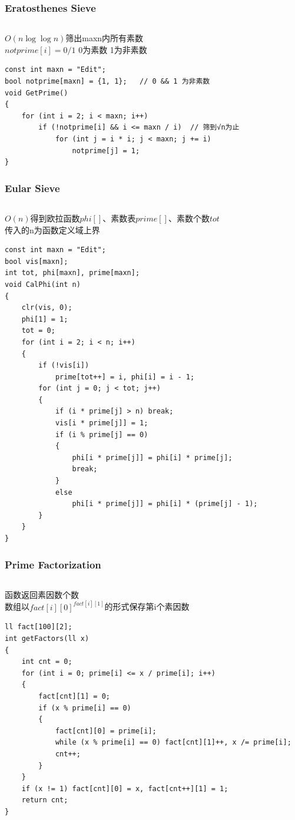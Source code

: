\documentclass[twoside]{article}
\begin{document}
\subsubsection{Eratosthenes Sieve}
\begin{lstlisting}
\end{lstlisting}
$O(n\log\log n)$筛出maxn内所有素数\\
$notprime[i] = 0/1$ 0为素数 1为非素数\\
\begin{lstlisting}
const int maxn = "Edit";
bool notprime[maxn] = {1, 1};   // 0 && 1 为非素数
void GetPrime()
{
    for (int i = 2; i < maxn; i++)
        if (!notprime[i] && i <= maxn / i)  // 筛到√n为止
            for (int j = i * i; j < maxn; j += i)
                notprime[j] = 1;
}
\end{lstlisting}
\subsubsection{Eular Sieve}
\begin{lstlisting}
\end{lstlisting}
$O(n)$得到欧拉函数$phi[]$、素数表$prime[]$、素数个数$tot$\\
传入的n为函数定义域上界
\begin{lstlisting}
const int maxn = "Edit";
bool vis[maxn];
int tot, phi[maxn], prime[maxn];
void CalPhi(int n)
{
    clr(vis, 0);
    phi[1] = 1;
    tot = 0;
    for (int i = 2; i < n; i++)
    {
        if (!vis[i])
            prime[tot++] = i, phi[i] = i - 1;
        for (int j = 0; j < tot; j++)
        {
            if (i * prime[j] > n) break;
            vis[i * prime[j]] = 1;
            if (i % prime[j] == 0)
            {
                phi[i * prime[j]] = phi[i] * prime[j];
                break;
            }
            else
                phi[i * prime[j]] = phi[i] * (prime[j] - 1);
        }
    }
}
\end{lstlisting}
\subsubsection{Prime Factorization}
\begin{lstlisting}
\end{lstlisting}
函数返回素因数个数\\
数组以$fact[i][0]^{fact[i][1]}$的形式保存第i个素因数
\begin{lstlisting}
ll fact[100][2];
int getFactors(ll x)
{
    int cnt = 0;
    for (int i = 0; prime[i] <= x / prime[i]; i++)
    {
        fact[cnt][1] = 0;
        if (x % prime[i] == 0)
        {
            fact[cnt][0] = prime[i];
            while (x % prime[i] == 0) fact[cnt][1]++, x /= prime[i];
            cnt++;
        }
    }
    if (x != 1) fact[cnt][0] = x, fact[cnt++][1] = 1;
    return cnt;
}
\end{lstlisting}
\end{document}
